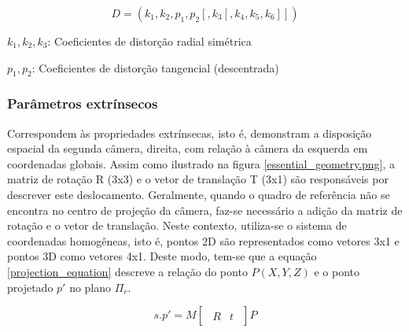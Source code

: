 \begin{equation}
  D = (k_1,k_2,p_1,p_2[,k_3[,k_4,k_5,k_6]])
\end{equation}

\begin{center}
  $k_1,k_2,k_3$: Coeficientes de distorção radial simétrica
  
  $p_1,p_2$: Coeficientes de distorção tangencial (descentrada)
\end{center}

\subsubsection{Parâmetros extrínsecos}
Correspondem às propriedades extrínsecas, isto é, demonstram a disposição espacial da segunda câmera, direita, com relação à câmera da esquerda em coordenadas globais. Assim como ilustrado na figura \ref{essential_geometry.png}, a matriz de rotação R (3x3) e o vetor de translação T (3x1) são responsáveis por descrever este deslocamento. Geralmente, quando o quadro de referência não se encontra no centro de projeção da câmera, faz-se necessário a adição da matriz de rotação e o vetor de translação. Neste contexto, utiliza-se o sistema de coordenadas homogêneas, isto é, pontos 2D são representados como vetores 3x1 e pontos 3D como vetores 4x1. Deste modo, tem-se que a equação \ref{projection_equation} descreve a relação do ponto $P(X,Y,Z)$ e o ponto projetado $p'$ no plano $\Pi_r$\cite{RobertLaganiere}.

\begin{equation}
  s.p' = M
  \begin{bmatrix}
  \begin{array}{c|c}
  R & t
  \end{array}
  \end{bmatrix}
  P 
\end{equation}

